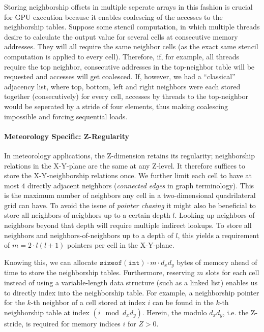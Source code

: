 Storing neighborship offsets in multiple seperate arrays in this fashion is crucial for GPU execution because it enables coalescing of the accesses to the neighborship tables. Suppose some stencil computation, in which multiple threads desire to calculate the output value for several cells at consecutive memory addresses. They will all require the same neighbor cells (as the exact same stencil computation is applied to every cell). Therefore, if, for example, all threads require the top neighbor, consecutive addresses in the top-neighbor table will be requested and accesses will get coalesced. If, however, we had a ``classical'' adjacency list, where top, bottom, left and right neighbors were each stored together (consecutively) for every cell, accesses by threads to the top-neighbor would be seperated by a stride of four elements, thus making coalescing impossible and forcing sequential loads.


\paragraph{Meteorology Specific: Z-Regularity}

In meteorology applications, the Z-dimension retains its regularity; neighborship relations in the X-Y-plane are the same at any Z-level. It therefore suffices to store the X-Y-neighborship relations once. We further limit each cell to have at most $4$ directly adjacent neighbors (\emph{connected edges} in graph terminology). This is the maximum number of neighbors any cell in a two-dimensional quadrilateral grid can have. To avoid the issue of \emph{pointer chasing} it might also be beneficial to store all neighbors-of-neigbhors up to a certain depth $l$. Looking up neighbors-of-neighbors beyond that depth will require multiple indirect lookups. To store all neighbors and neighbors-of-neighbors up to a depth of $l$, this yields a requirement of $m=2\cdot l(l+1)$ pointers per cell in the X-Y-plane.

Knowing this, we can allocate $\mathtt{sizeof(int)}\cdot m \cdot d_x d_y$ bytes of memory ahead of time to store the neighborship tables. Furthermore, reserving $m$ slots for each cell instead of using a variable-length data structure (such as a linked list) enables us to directly index into the neighborship table. For example, a neighborship pointer for the $k$-th neighbor of a cell stored at index $i$ can be found in the $k$-th neighborship table at index $(i \mod d_xd_y)$. Herein, the modulo $d_xd_y$, i.e. the Z-stride, is required for memory indices $i$ for $Z>0$.

